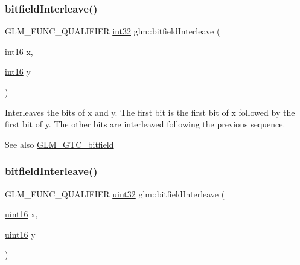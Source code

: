 \subsubsection{\texorpdfstring{bitfield\+Interleave()}{bitfieldInterleave()}\hspace{0.1cm}{\footnotesize\ttfamily [3/16]}}
{\footnotesize\ttfamily G\+L\+M\+\_\+\+F\+U\+N\+C\+\_\+\+Q\+U\+A\+L\+I\+F\+I\+ER \hyperlink{group__gtc__type__precision_ga632d8b25f6b61659f39ea4321fab92a4}{int32} glm\+::bitfield\+Interleave (\begin{DoxyParamCaption}\item[{\hyperlink{group__gtc__type__precision_ga2945a61d12771f8954994fcddf02b021}{int16}}]{x,  }\item[{\hyperlink{group__gtc__type__precision_ga2945a61d12771f8954994fcddf02b021}{int16}}]{y }\end{DoxyParamCaption})}

Interleaves the bits of x and y. The first bit is the first bit of x followed by the first bit of y. The other bits are interleaved following the previous sequence.

\begin{DoxySeeAlso}{See also}
\hyperlink{group__gtc__bitfield}{G\+L\+M\+\_\+\+G\+T\+C\+\_\+bitfield} 
\end{DoxySeeAlso}
\mbox{\label{group__gtc__bitfield_ga19ef8360379483e3ee245e89cb62ff93}} 
\subsubsection{\texorpdfstring{bitfield\+Interleave()}{bitfieldInterleave()}\hspace{0.1cm}{\footnotesize\ttfamily [4/16]}}
{\footnotesize\ttfamily G\+L\+M\+\_\+\+F\+U\+N\+C\+\_\+\+Q\+U\+A\+L\+I\+F\+I\+ER \hyperlink{group__gtc__type__precision_ga202b6a53c105fcb7e531f9b443518451}{uint32} glm\+::bitfield\+Interleave (\begin{DoxyParamCaption}\item[{\hyperlink{group__gtc__type__precision_gad8c2939e1fdd8e5828b31d95c52255d5}{uint16}}]{x,  }\item[{\hyperlink{group__gtc__type__precision_gad8c2939e1fdd8e5828b31d95c52255d5}{uint16}}]{y }\end{DoxyParamCaption})}

